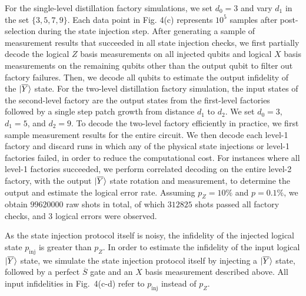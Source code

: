 For the single-level distillation factory simulations, we set $d_0 = 3$ and vary $d_1$ in the set $\{3, 5, 7, 9\}$. Each data point in Fig. 4(c) represents $10^5$ samples after post-selection during the state injection step. After generating a sample of measurement results that succeeded in all state injection checks, we first partially decode the logical $Z$ basis measurements on all injected qubits and logical $X$ basis measurements on the remaining qubits other than the output qubit to filter out factory failures. Then, we decode all qubits to estimate the output infidelity of the $|{\overline{Y}}\rangle$ state.
%
For the two-level distillation factory simulation, the input states of the second-level factory are the output states from the first-level factories followed by a single step patch growth from distance $d_1$ to $d_2$. We set $d_0 = 3$, $d_1=5$, and $d_2=9$.
%
To decode the two-level factory efficiently in practice, we first sample measurement results for the entire circuit.
%
We then decode each level-1 factory and discard runs in which any of the physical state injections or level-1 factories failed, in order to reduce the computational cost.
%
For instances where all level-1 factories succeeded, we perform correlated decoding on the entire level-2 factory, with the output $|{\overline{Y}}\rangle$ state rotation and measurement, to determine the output and estimate the logical error rate.
%
Assuming $p_Z = 10\%$ and $p = 0.1\%$, we obtain $99620000$ raw shots in total, of which $312825$ shots passed all factory checks, and $3$ logical errors were observed.

As the state injection protocol itself is noisy, the infidelity of the injected logical state $p_{\mathrm{inj}}$ is greater than $p_Z$. In order to estimate the infidelity of the input logical $|{\overline{Y}}\rangle$ state, we simulate the state injection protocol itself by injecting a $|{\overline{Y}}\rangle$ state, followed by a perfect $\overline{S}$ gate and an $X$ basis measurement described above. All input infidelities in Fig.~4(c-d) refer to $p_{\mathrm{inj}}$ instead of $p_Z$.

